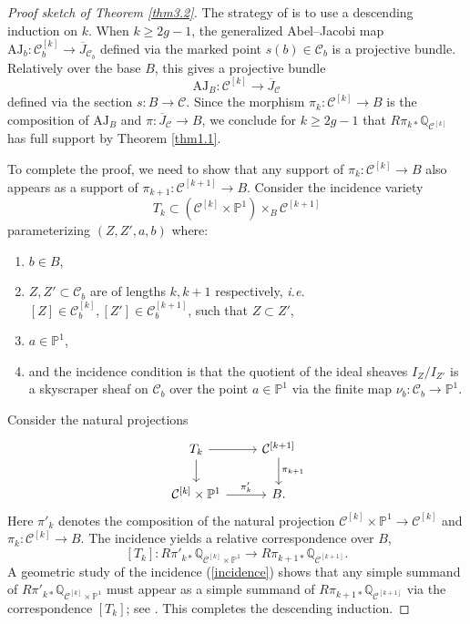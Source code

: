 \documentclass{pspum-l}
\theoremstyle{plain}
\theoremstyle{definition}
\theoremstyle{remark}
\newcommand{\BP}{{\mathbb{P}}}
\newcommand{\BQ}{{\mathbb{Q}}}
\newcommand{\CC}{{\mathcal C}}
\begin{document}
\begin{proof}[Proof sketch of Theorem \ref{thm3.2}]
The strategy of \cite{MY} is to use a descending induction on $k$. When $k \geq 2g-1$, the generalized Abel--Jacobi map $\mathrm{AJ}_b: \CC_b^{[k]} \to \overline{J}_{\CC_b}$ defined via the marked point $s(b) \in \CC_b$ is a projective bundle. Relatively over the base $B$, this gives a projective bundle
\[
\mathrm{AJ}_B: \CC^{[k]} \to \overline{J}_\CC
\]
defined via the section $s: B \to \CC $. Since the morphism $\pi_k:\CC^{[k]} \to B$ is the composition of $\mathrm{AJ}_B$ and $\pi: \overline{J}_\CC \to B$, we conclude for $k\geq 2g-1$ that $R\pi_{k*} \BQ_{\CC^{[k]}}$ has full support by Theorem \ref{thm1.1}.

To complete the proof, we need to show that any support of $\pi_{k}: \CC^{[k]} \to B$ also appears as a support of $\pi_{k+1}: \CC^{[k+1]} \to B$. Consider the incidence variety
\[
T_k \subset \left( \CC^{[k]} \times \BP^1 \right) \times_B \CC^{[k+1]}
\]
parameterizing $(Z, Z',a,b)$ where:
\begin{enumerate}
    \item[$\bullet$]  $b \in B$,
    \item[$\bullet$] $Z,Z' \subset \CC_b$ are of lengths $k, k+1$ respectively, \emph{i.e.} $[Z] \in \CC_b^{[k]}, [Z'] \in \CC_b^{[k+1]}$, such that $Z\subset Z'$,
    \item[$\bullet$] $a \in \BP^1$, 
    \item[$\bullet$] and the incidence condition is that the quotient of the ideal sheaves $I_{Z}/I_{Z'}$ is a skyscraper sheaf on $\CC_b$ over the point $a \in \BP^1$ via the finite map $\nu_b: \CC_b \to \BP^1$.
\end{enumerate} 

\medskip

Consider the natural projections
\begin{equation}\label{incidence}
    \begin{tikzcd}
T_k \arrow[r, ""] \arrow[d, ""]
& \CC^{[k+1]} \arrow[d, "\pi_{k+1}"]\\
\CC^{[k]} \times \BP^1 \arrow[r, "\pi'_k"] & B.
\end{tikzcd}
\end{equation}
Here $\pi'_k$ denotes the composition of the natural projection $\CC^{[k]} \times \BP^1 \to \CC^{[k]}$ and $\pi_k: \CC^{[k]} \to B$.
The incidence yields a relative correspondence over $B$,
\[
[T_k]: R\pi'_{k*} \BQ_{\CC^{[k]} \times \BP^1} \to R\pi_{k+1*} \BQ_{\CC^{[k+1]}}.
\]
A geometric study of the incidence (\ref{incidence}) shows that any simple summand of $R\pi'_{k*} \BQ_{\CC^{[k]} \times \BP^1}$ must appear as a simple summand of $ R\pi_{k+1*} \BQ_{\CC^{[k+1]}}$ via the correspondence $[T_k]$; see \cite[Page 10]{MY}. This completes the descending induction.
\end{proof}
\end{document}
